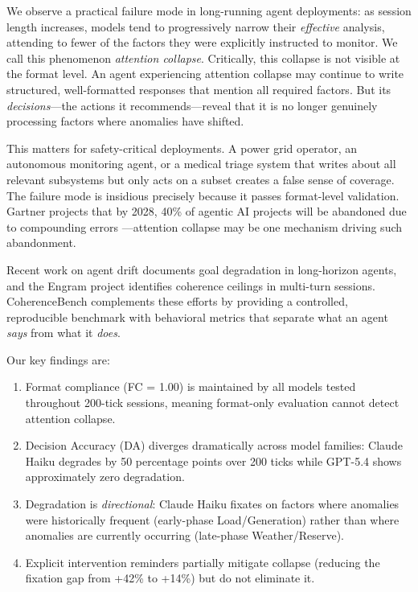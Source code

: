 \documentclass{article}
\begin{document}
We observe a practical failure mode in long-running agent deployments: as
session length increases, models tend to progressively narrow their
\emph{effective} analysis, attending to fewer of the factors they were
explicitly instructed to monitor. We call this phenomenon \emph{attention
collapse}. Critically, this collapse is not visible at the format level.
An agent experiencing attention collapse may continue to write
structured, well-formatted responses that mention all required factors.
But its \emph{decisions}---the actions it recommends---reveal that it is
no longer genuinely processing factors where anomalies have shifted.

This matters for safety-critical deployments. A power grid operator, an
autonomous monitoring agent, or a medical triage system that writes about
all relevant subsystems but only acts on a subset creates a false sense
of coverage. The failure mode is insidious precisely because it passes
format-level validation. Gartner projects that by 2028, 40\% of agentic
AI projects will be abandoned due to compounding errors
\cite{gartner2025agents}---attention collapse may be one mechanism
driving such abandonment.

Recent work on agent drift \cite{agentdrift2025} documents goal
degradation in long-horizon agents, and the Engram project
\cite{engram2026} identifies coherence ceilings in multi-turn sessions.
CoherenceBench complements these efforts by providing a controlled,
reproducible benchmark with behavioral metrics that separate what an
agent \emph{says} from what it \emph{does}.

Our key findings are:
\begin{enumerate}
    \item Format compliance (FC = 1.00) is maintained by all models
    tested throughout 200-tick sessions, meaning format-only evaluation
    cannot detect attention collapse.
    \item Decision Accuracy (DA) diverges dramatically across model
    families: Claude Haiku degrades by 50 percentage points over 200
    ticks while GPT-5.4 shows approximately zero degradation.
    \item Degradation is \emph{directional}: Claude Haiku fixates on
    factors where anomalies were historically frequent (early-phase
    Load/Generation) rather than where anomalies are currently occurring
    (late-phase Weather/Reserve).
    \item Explicit intervention reminders partially mitigate collapse
    (reducing the fixation gap from +42\% to +14\%) but do not eliminate
    it.
\end{enumerate}
\end{document}
